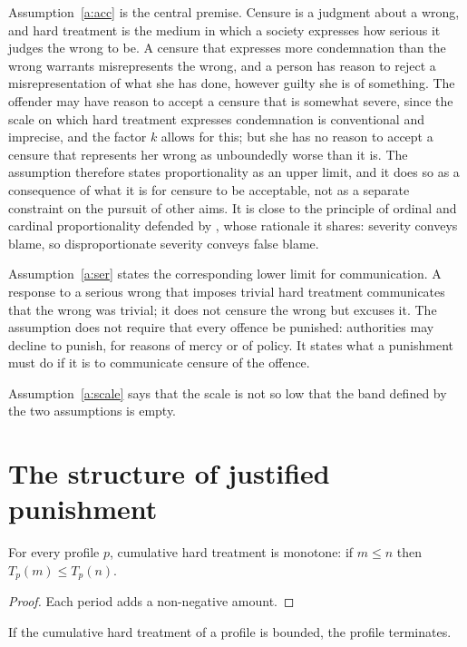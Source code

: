 \documentclass{situationist-preprint}
\begin{document}
Assumption~\ref{a:acc} is the central premise. Censure is a judgment about a wrong, and hard treatment is the medium in which a society expresses how serious it judges the wrong to be. A censure that expresses more condemnation than the wrong warrants misrepresents the wrong, and a person has reason to reject a misrepresentation of what she has done, however guilty she is of something. The offender may have reason to accept a censure that is somewhat severe, since the scale on which hard treatment expresses condemnation is conventional and imprecise, and the factor $k$ allows for this; but she has no reason to accept a censure that represents her wrong as unboundedly worse than it is. The assumption therefore states proportionality as an upper limit, and it does so as a consequence of what it is for censure to be acceptable, not as a separate constraint on the pursuit of other aims. It is close to the principle of ordinal and cardinal proportionality defended by \citet{vonHirsch1993}, whose rationale it shares: severity conveys blame, so disproportionate severity conveys false blame.

Assumption~\ref{a:ser} states the corresponding lower limit for communication. A response to a serious wrong that imposes trivial hard treatment communicates that the wrong was trivial; it does not censure the wrong but excuses it. The assumption does not require that every offence be punished: authorities may decline to punish, for reasons of mercy or of policy. It states what a punishment must do if it is to communicate censure of the offence.

Assumption~\ref{a:scale} says that the scale is not so low that the band defined by the two assumptions is empty.

\section{The structure of justified punishment}

\begin{lemma}\label{l:mono}
For every profile $p$, cumulative hard treatment is monotone: if $m\le n$ then $T_p(m)\le T_p(n)$.
\end{lemma}

\begin{proof}
Each period adds a non-negative amount.
\end{proof}

\begin{lemma}\label{l:bounded}
If the cumulative hard treatment of a profile is bounded, the profile terminates.
\end{lemma}
\end{document}
